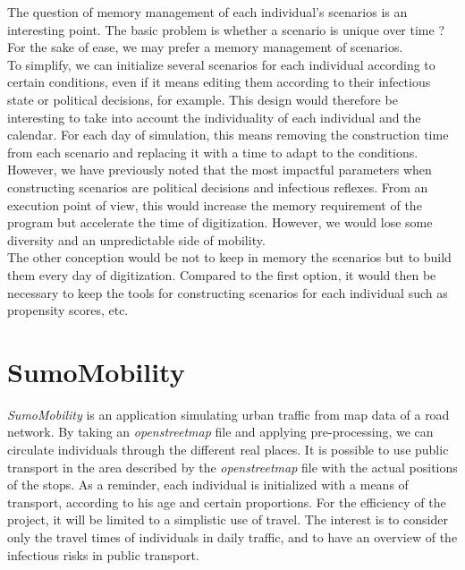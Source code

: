 The question of memory management of each individual's scenarios is an interesting point. The basic problem is whether a scenario is unique over time ? For the sake of ease, we may prefer a memory management of scenarios.\\

To simplify, we can initialize several scenarios for each individual according to certain conditions, even if it means editing them according to their infectious state or political decisions, for example. This design would therefore be interesting to take into account the individuality of each individual and the calendar. For each day of simulation, this means removing the construction time from each scenario and replacing it with a time to adapt to the conditions.\\

However, we have previously noted that the most impactful parameters when constructing scenarios are political decisions and infectious reflexes. From an execution point of view, this would increase the memory requirement of the program but accelerate the time of digitization. However, we would lose some diversity and an unpredictable side of mobility.\\

The other conception would be not to keep in memory the scenarios but to build them every day of digitization. Compared to the first option, it would then be necessary to keep the tools for constructing scenarios for each individual such as propensity scores, etc.\\

\newpage

\section{SumoMobility}

\textit{SumoMobility} is an application simulating urban traffic from map data of a road network. By taking an \textit{openstreetmap} file and applying pre-processing, we can circulate individuals through the different real places. It is possible to use public transport in the area described by the \textit{openstreetmap} file with the actual positions of the stops. As a reminder, each individual is initialized with a means of transport, according to his age and certain proportions. For the efficiency of the project, it will be limited to a simplistic use of travel. The interest is to consider only the travel times of individuals in daily traffic, and to have an overview of the infectious risks in public transport.\\

